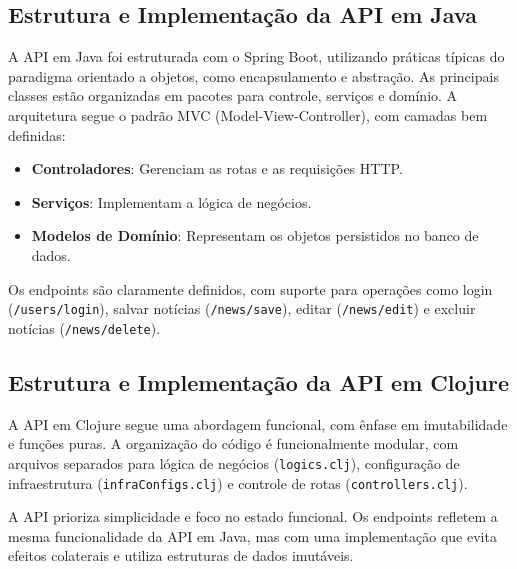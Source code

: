 \subsection{Estrutura e Implementação da API em Java}
A API em Java foi estruturada com o Spring Boot, utilizando práticas típicas do paradigma orientado a objetos, como encapsulamento e abstração. As principais classes estão organizadas em pacotes para controle, serviços e domínio. A arquitetura segue o padrão MVC (Model-View-Controller), com camadas bem definidas:
\begin{itemize}
    \item \textbf{Controladores}: Gerenciam as rotas e as requisições HTTP.
    \item \textbf{Serviços}: Implementam a lógica de negócios.
    \item \textbf{Modelos de Domínio}: Representam os objetos persistidos no banco de dados.
\end{itemize}

Os endpoints são claramente definidos, com suporte para operações como login (\texttt{/users/login}), salvar notícias (\texttt{/news/save}), editar (\texttt{/news/edit}) e excluir notícias (\texttt{/news/delete}).

\subsection{Estrutura e Implementação da API em Clojure}
A API em Clojure segue uma abordagem funcional, com ênfase em imutabilidade e funções puras. A organização do código é funcionalmente modular, com arquivos separados para lógica de negócios (\texttt{logics.clj}), configuração de infraestrutura (\texttt{infraConfigs.clj}) e controle de rotas (\texttt{controllers.clj}).

A API prioriza simplicidade e foco no estado funcional. Os endpoints refletem a mesma funcionalidade da API em Java, mas com uma implementação que evita efeitos colaterais e utiliza estruturas de dados imutáveis.

